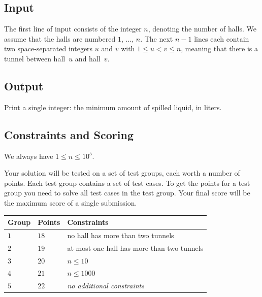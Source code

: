 \subsection*{Input}

The first line of input consists of the integer $n$, denoting the number of halls.
We assume that the halls are numbered $1$, $\ldots$, $n$.
The next $n-1$ lines each contain two space-separated integers $u$ and $v$ with 
$1\leq u < v \leq n$, %
meaning that there is a tunnel between hall~$u$ and hall~$v$.

\subsection*{Output}

Print a single integer: the minimum amount of spilled liquid, in liters.

\subsection*{Constraints and Scoring}

We always have
$1\leq n\leq 10^5$. %

Your solution will be tested on a set of test groups, each worth a number of points.
Each test group contains a set of test cases.
To get the points for a test group you need to solve all test cases in the test group.
Your final score will be the maximum score of a single submission.

\medskip
\begin{tabular}{lll}
Group & Points & Constraints \\\hline
  $1$ & $18$ & no hall has more than two tunnels\\
  $2$ & $19$ & at most one hall has more than two tunnels\\
  $3$ & $20$ & $n\leq 10$\\
  $4$ & $21$ & $n\leq 1000$\\
  $5$ & $22$ & \emph{no additional constraints}
\end{tabular}
